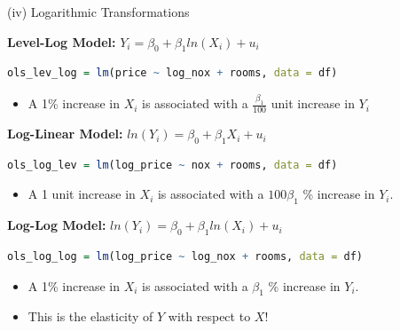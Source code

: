 \documentclass[11pt, aspectratio = 169]{beamer}
\begin{document}
\begin{frame}[fragile]{(iv) Logarithmic Transformations}

\color{teal}\textbf{Level-Log Model:}\color{black} $Y_i=\beta_0+\beta_1ln(X_i) + u_i$
\begin{lstlisting}[language=R]
    ols_lev_log = lm(price ~ log_nox + rooms, data = df)
\end{lstlisting}
		\begin{itemize}
		\item A 1\% increase in $X_i$ is associated with a $\frac{\beta_1}{100}$ unit increase in $Y_i$ 
	\end{itemize}
\pause
\color{teal}\textbf{Log-Linear Model:} \color{black} $ln(Y_i)=\beta_0+\beta_1 X_i + u_i$
\begin{lstlisting}[language=R]
    ols_log_lev = lm(log_price ~ nox + rooms, data = df)
\end{lstlisting}
\begin{itemize}
		\item A 1 unit increase in $X_i$ is associated with a $100\beta_1$ \% increase in $Y_i$.
	\end{itemize}
\pause
\color{teal}\textbf{Log-Log Model:} \color{black}$ln(Y_i)=\beta_0+\beta_1ln(X_i) + u_i$
\begin{lstlisting}[language=R]
    ols_log_log = lm(log_price ~ log_nox + rooms, data = df)
\end{lstlisting}
		\begin{itemize}
		\item A 1\% increase in $X_i$ is associated with a $\beta_1$ \% increase in $Y_i$.
		\item This is the elasticity of $Y$ with respect to $X$!
	\end{itemize}
\end{frame}
\end{document}
